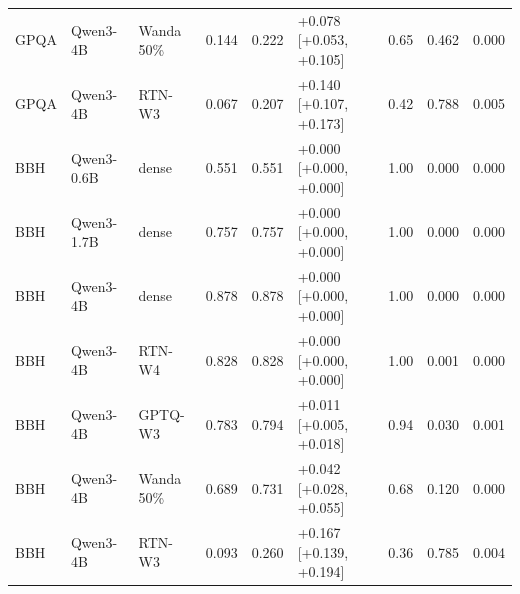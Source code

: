 \begin{tabular}{lllrrlrrr}
GPQA & Qwen3-4B & Wanda 50\% & 0.144 & 0.222 & +0.078 [+0.053, +0.105] & 0.65 & 0.462 & 0.000 \\
GPQA & Qwen3-4B & RTN-W3 & 0.067 & 0.207 & +0.140 [+0.107, +0.173] & 0.42 & 0.788 & 0.005 \\
BBH & Qwen3-0.6B & dense & 0.551 & 0.551 & +0.000 [+0.000, +0.000] & 1.00 & 0.000 & 0.000 \\
BBH & Qwen3-1.7B & dense & 0.757 & 0.757 & +0.000 [+0.000, +0.000] & 1.00 & 0.000 & 0.000 \\
BBH & Qwen3-4B & dense & 0.878 & 0.878 & +0.000 [+0.000, +0.000] & 1.00 & 0.000 & 0.000 \\
BBH & Qwen3-4B & RTN-W4 & 0.828 & 0.828 & +0.000 [+0.000, +0.000] & 1.00 & 0.001 & 0.000 \\
BBH & Qwen3-4B & GPTQ-W3 & 0.783 & 0.794 & +0.011 [+0.005, +0.018] & 0.94 & 0.030 & 0.001 \\
BBH & Qwen3-4B & Wanda 50\% & 0.689 & 0.731 & +0.042 [+0.028, +0.055] & 0.68 & 0.120 & 0.000 \\
BBH & Qwen3-4B & RTN-W3 & 0.093 & 0.260 & +0.167 [+0.139, +0.194] & 0.36 & 0.785 & 0.004 \\
\bottomrule
\end{tabular}
